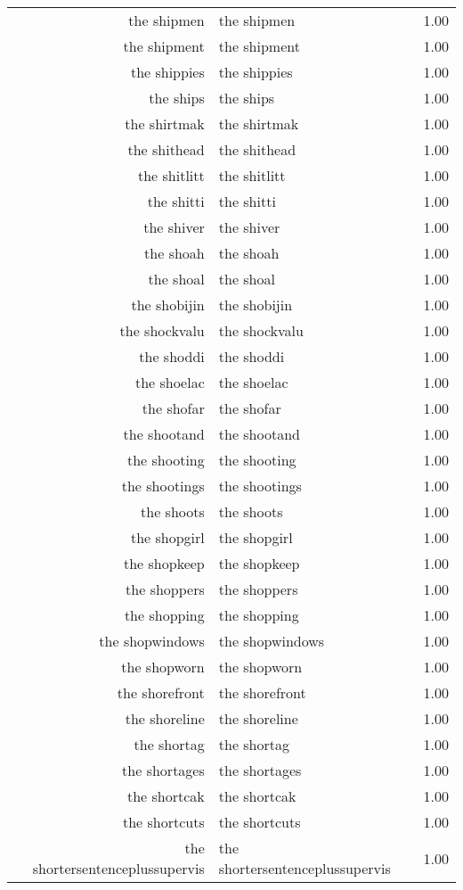 \begin{table}[ht]
\begin{tabular}{rlr}
  the shipmen & the shipmen & 1.00 \\ 
  the shipment & the shipment & 1.00 \\ 
  the shippies & the shippies & 1.00 \\ 
  the ships & the ships & 1.00 \\ 
  the shirtmak & the shirtmak & 1.00 \\ 
  the shithead & the shithead & 1.00 \\ 
  the shitlitt & the shitlitt & 1.00 \\ 
  the shitti & the shitti & 1.00 \\ 
  the shiver & the shiver & 1.00 \\ 
  the shoah & the shoah & 1.00 \\ 
  the shoal & the shoal & 1.00 \\ 
  the shobijin & the shobijin & 1.00 \\ 
  the shockvalu & the shockvalu & 1.00 \\ 
  the shoddi & the shoddi & 1.00 \\ 
  the shoelac & the shoelac & 1.00 \\ 
  the shofar & the shofar & 1.00 \\ 
  the shootand & the shootand & 1.00 \\ 
  the shooting & the shooting & 1.00 \\ 
  the shootings & the shootings & 1.00 \\ 
  the shoots & the shoots & 1.00 \\ 
  the shopgirl & the shopgirl & 1.00 \\ 
  the shopkeep & the shopkeep & 1.00 \\ 
  the shoppers & the shoppers & 1.00 \\ 
  the shopping & the shopping & 1.00 \\ 
  the shopwindows & the shopwindows & 1.00 \\ 
  the shopworn & the shopworn & 1.00 \\ 
  the shorefront & the shorefront & 1.00 \\ 
  the shoreline & the shoreline & 1.00 \\ 
  the shortag & the shortag & 1.00 \\ 
  the shortages & the shortages & 1.00 \\ 
  the shortcak & the shortcak & 1.00 \\ 
  the shortcuts & the shortcuts & 1.00 \\ 
  the shortersentenceplussupervis & the shortersentenceplussupervis & 1.00 \\ 

\end{tabular}
\end{table}
